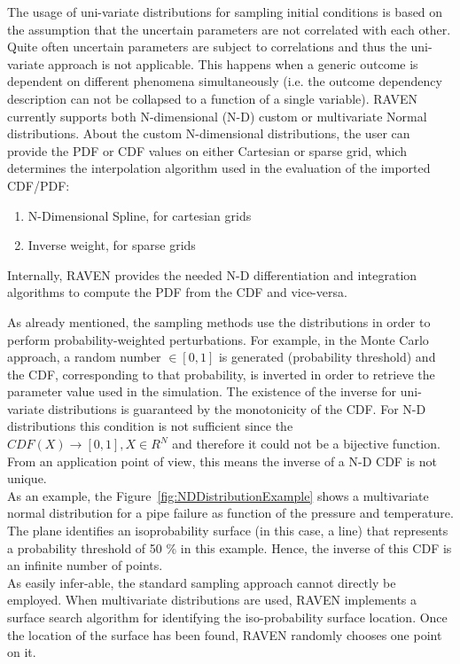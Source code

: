 The usage of uni-variate distributions for sampling initial conditions is based on the assumption that the uncertain 
parameters are not correlated with each other. Quite often uncertain parameters are subject to correlations and thus the 
uni-variate approach is not applicable. This happens when a generic outcome is dependent on different phenomena 
simultaneously (i.e. the outcome dependency description can not be collapsed to a function of a single variable). RAVEN 
currently supports both N-dimensional (N-D) custom or multivariate Normal distributions. About the custom N-dimensional 
distributions, the user can provide the PDF or CDF values on either Cartesian or sparse grid, which determines the 
interpolation algorithm used in the evaluation of the imported CDF/PDF:
\begin{enumerate}
  \item N-Dimensional Spline, for cartesian grids
  \item Inverse weight, for sparse grids
\end{enumerate}
Internally, RAVEN provides the needed N-D differentiation and integration algorithms to compute the PDF from the CDF 
and vice-versa.

As already mentioned, the sampling methods use the distributions in order to perform probability-weighted perturbations. 
For example, in the Monte Carlo approach, a random number $\in [0,1]$ is generated (probability threshold) and the CDF, 
corresponding to that probability, is inverted in order to retrieve the parameter value used in the simulation. The existence 
of the inverse for uni-variate distributions is guaranteed by the monotonicity of the CDF. For N-D distributions this condition 
is 
not sufficient since the $CDF(X)\longrightarrow [0,1],X \in  R^{N} $ and therefore it could not be a bijective function. From 
an application point of view, this means the inverse of a N-D CDF is not unique.
\\As an example, the Figure~\ref{fig:NDDistributionExample} shows a multivariate normal distribution for a pipe failure as 
function of the pressure and temperature. The plane identifies an isoprobability surface (in this case, a line) that represents 
a probability threshold of 50 \% in this example.  Hence, the inverse of this CDF is an infinite number of points.
 \\As easily infer-able, the standard sampling approach cannot directly be employed. When multivariate distributions are 
 used, RAVEN implements a surface search algorithm for identifying the iso-probability surface location. Once the location 
 of the surface has been found, RAVEN randomly chooses one point on it.

